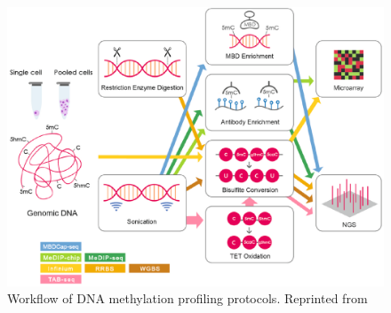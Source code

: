 \begin{figure}[H]
	\centering
	\includegraphics[width=0.8\linewidth]{methylation_protocols}
	\caption[]{Workflow of DNA methylation profiling protocols. Reprinted from \cite{Yong2016}}
	\label{fig:methylation_protocols}
\end{figure}



